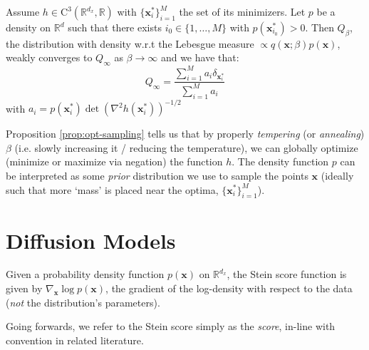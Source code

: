 \begin{proposition} \label{prop:opt-sampling}
    Assume $h \in \mathrm{C}^3(\mathbb{R}^{d_x}, \mathbb{R})$ with $\{\mathbf{x}_i^*\}_{i=1}^M$ the
    set of its minimizers. Let $p$ be a density on $\mathbb{R}^d$ such that there exists
    $i_0 \in \{1, \dots, M\}$ with $p(\mathbf{x}_{i_0}^*) > 0$. Then $Q_\beta$, the distribution
    with density w.r.t the Lebesgue measure $\propto q(\mathbf{x}; \beta)p(\mathbf{x})$, weakly
    converges to $Q_{\infty}$ as $\beta \rightarrow \infty$ and we have that:
    $$
    Q_\infty = \frac{\sum_{i=1}^{M}a_i\delta_{\mathbf{x}_i^*}}{\sum_{i=1}^{M}a_i}
    $$
    with $a_i = p(\mathbf{x}_i^*)\det(\nabla^2h(\mathbf{x}_i^*))^{-1/2}$
\end{proposition}

\begin{remark}[Annealing]
    Proposition \ref{prop:opt-sampling} tells us that by properly \emph{tempering}
    (or \emph{annealing}) $\beta$ (i.e. slowly increasing it / reducing the temperature), we can
    globally optimize (minimize or maximize via negation) the function $h$. The density function $p$
    can be interpreted as some \emph{prior} distribution we use to sample the points $\mathbf{x}$
    (ideally such that more `mass' is placed near the optima, $\{\mathbf{x}_i^*\}_{i=1}^M$).
\end{remark}

\section{Diffusion Models}\label{sec:diffusion-models}

\begin{definition} \label{defn:stein-score}
    Given a probability density function $p(\mathbf{x})$ on $\mathbb{R}^{d_x}$, the Stein score
    function is given by $\nabla_{\mathbf{x}} \log p(\mathbf{x})$, the gradient of the log-density
    with respect to the data (\emph{not} the distribution's parameters).
\end{definition}

Going forwards, we refer to the Stein score simply as the \emph{score}, in-line with convention in
related literature.

